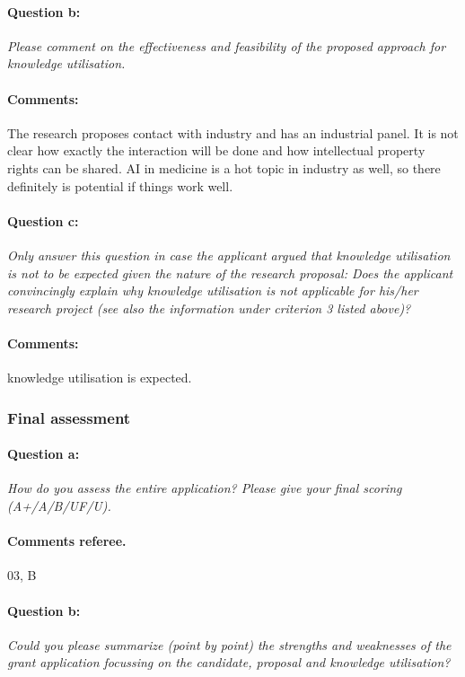 \documentclass[serif, twocolumn, numeric, rga]{jote-article}
\begin{document}
\paragraph{Question b:}
\textit{Please comment on the effectiveness and feasibility of the proposed approach for knowledge utilisation.}
\paragraph{Comments:}
The research proposes contact with industry and has an industrial panel. It is not clear how exactly the interaction will be done and how intellectual property rights can be shared. AI in medicine is a hot topic in industry as well, so there definitely is potential if things work well.
\paragraph{Question c:}
\textit{Only answer this question in case the applicant argued that knowledge utilisation is not to be expected given the nature of the research proposal: Does the applicant convincingly explain why knowledge utilisation is not applicable for his/her research project (see also the information under criterion 3 listed above)?}
\paragraph{Comments:}
knowledge utilisation is expected.

 {}\subsubsection*{Final assessment} 
\paragraph{Question a:}
\textit{How do you assess the entire application? Please give your final scoring (A+/A/B/UF/U).}
\paragraph{Comments referee.}
03, B
\paragraph{Question b:}
\textit{Could you please summarize (point by point) the strengths and weaknesses of the grant application focussing on the candidate, proposal and knowledge utilisation?}
\end{document}
